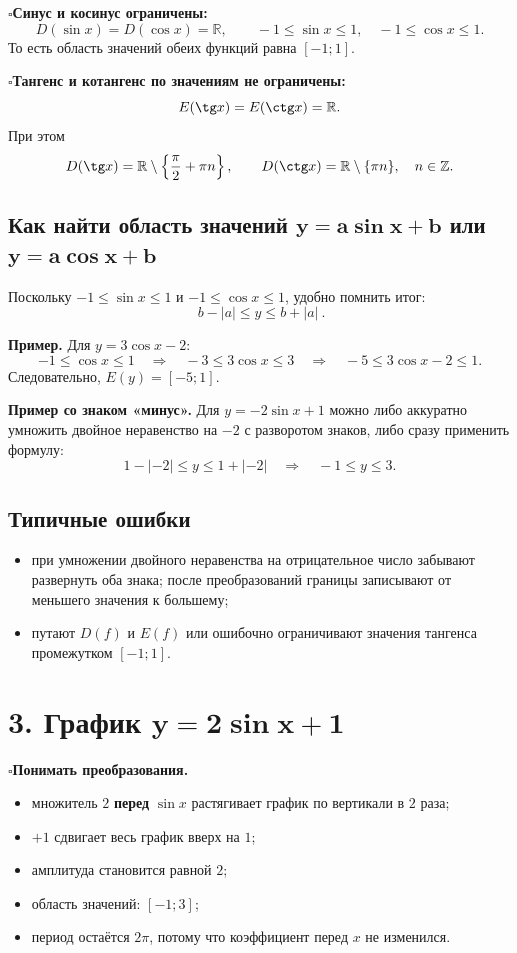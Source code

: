 \documentclass[a4paper,12pt]{article}
\newcommand{\checkitem}{\(\square\)\hspace{0.45em}}
\newcommand{\sectionrule}{\par\vspace{-0.3em}{\color{accent}\rule{\linewidth}{0.7pt}}\vspace{0.6em}}
\newcommand{\key}[1]{\textbf{\color{darkaccent}#1}}
\newcommand{\R}{\mathbb{R}}
\begin{document}
\checkitem \key{Синус и косинус ограничены:}
\[
D(\sin x)=D(\cos x)=\R,\qquad
-1\le \sin x\le1,\quad -1\le\cos x\le1.
\]
То есть область значений обеих функций равна $[-1;1]$.

\checkitem \key{Тангенс и котангенс по значениям не ограничены:}
\[
E(\tg x)=E(\ctg x)=\R.
\]
При этом
\[
D(\tg x)=\R\setminus\left\{\frac{\pi}{2}+\pi n\right\},\qquad
D(\ctg x)=\R\setminus\{\pi n\},\quad n\in\mathbb Z.
\]

\subsection*{Как найти область значений $\boldsymbol{y=a\sin x+b}$ или $\boldsymbol{y=a\cos x+b}$}
Поскольку $-1\le\sin x\le1$ и $-1\le\cos x\le1$, удобно помнить итог:
\[
\boxed{\ b-|a|\le y\le b+|a|\ }.
\]

\textbf{Пример.} Для $y=3\cos x-2$:
\[
-1\le\cos x\le1
\quad\Longrightarrow\quad
-3\le3\cos x\le3
\quad\Longrightarrow\quad
-5\le3\cos x-2\le1.
\]
Следовательно, $E(y)=[-5;1]$.

\textbf{Пример со знаком «минус».} Для $y=-2\sin x+1$ можно либо аккуратно умножить двойное неравенство на $-2$ с разворотом знаков, либо сразу применить формулу:
\[
1-|-2|\le y\le1+|-2|
\quad\Longrightarrow\quad
-1\le y\le3.
\]

\subsection*{Типичные ошибки}
\begin{itemize}[itemsep=0pt,topsep=2pt]
\item при умножении двойного неравенства на отрицательное число забывают развернуть оба знака; после преобразований границы записывают от меньшего значения к большему;
\item путают $D(f)$ и $E(f)$ или ошибочно ограничивают значения тангенса промежутком $[-1;1]$.
\end{itemize}

\clearpage

\section*{3. График $\boldsymbol{y=2\sin x+1}$}
\sectionrule

\checkitem \key{Понимать преобразования.}
\begin{itemize}
\item множитель $2$ \textbf{перед} $\sin x$ растягивает график по вертикали в $2$ раза;
\item $+1$ сдвигает весь график вверх на $1$;
\item амплитуда становится равной $2$;
\item область значений: $[-1;3]$;
\item период остаётся $2\pi$, потому что коэффициент перед $x$ не изменился.
\end{itemize}
\end{document}
